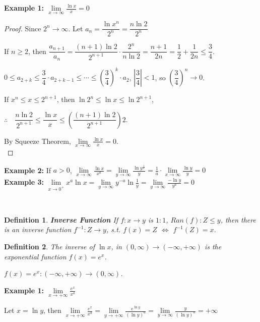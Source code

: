 \documentclass[12pt]{article}
\newcommand{\abs}[1]{\left| #1 \right|}
\theoremstyle{plain}
\newtheorem{definition}{Definition}[subsection]
\newcommand{\dlim}{\displaystyle\lim\limits}
\begin{document}
    {\color{Brown}
    \textbf{Example 1: $\dlim_{x\to\infty} \frac{\ln x}x=0$}
    \begin{proof}
        Since $2^n\to\infty$.  Let $a_n = \dfrac{\ln x^n}{2^n}=
        \dfrac{n\ln2}{2^n}$

        If $n\geq 2$, then $\dfrac{a_{n+1}}{a_n}=\dfrac{(n+1)\ln 2}{2^{n+1}}
        \cdot \dfrac{2^n}{n\ln 2}
        =\dfrac{n+1}{2n}=\dfrac12+\dfrac1{2n}\leq \dfrac34$.

        $0\leq a_{2+k}\leq \dfrac34 \cdot a_{2+k-1}
        \leq\cdots\leq (\dfrac34)^k\cdot a_2$, $\abs{\dfrac34}<1$,
        so $(\dfrac34)^n\to 0$.

        If $x^n\leq x\leq 2^{n+1}$, then $\ln 2^n\leq \ln x\leq \ln 2^{n+1}$,
        
        $\therefore\quad \dfrac{n\ln 2}{2^{n+1}}\leq \dfrac{\ln x}x \leq (\dfrac{(n+1)\ln2}{2^{n+1}})2$.

        By Squeeze Theorem, $\dlim_{x\to\infty} \frac{\ln x}x =0$.\\
    \end{proof}

    \textbf{Example 2:} If $a>0$, $\dlim_{x\to\infty} \frac{\ln x}{x^a}=
    \dlim_{y\to\infty} \frac{\ln y^{\frac1a}}y 
    =\frac1a \cdot \dlim_{x\to\infty} \frac{\ln y} y =0$\\

    \textbf{Example 3:} $\dlim_{x\to 0^+} x^a \ln x 
    = \dlim_{y\to\infty} y^{-a}\ln \frac 1y
    = \dlim_{y\to\infty} \frac{-\ln y}{y^a} =0$}\\


    \begin{definition}\textbf{Inverse Function}
        If $f:x \to y$ is $1:1$, $Ran(f): Z\leq y$, 
        then there is an inverse function
        $f^{-1}:Z \to y$, s.t. $f(x)=Z$ $\iff $ $f^{-1}(Z)=x$. \\
    \end{definition}

    \begin{definition}
        The inverse of $\ln x$, in $(0, \infty) \to (-\infty, +\infty)$ 
        is the exponential function $f(x) = e^x$.

        $f(x) = e^x: (-\infty, +\infty) \to (0, \infty)$.\\
    \end{definition}

    {\color{Brown}\textbf{Example 1: $\dlim_{x\to+\infty} \frac{e^x} {x^a}$}

    Let $x=\ln y$, then $\dlim_{x\to+\infty} \frac{e^x} {x^a} 
    = \dlim_{y\to+\infty} \frac{e^{\ln y}}{(\ln y)^a} 
    =\dlim_{y\to\infty} \frac y{(\ln y)^n}=+\infty$}\\
\end{document}
